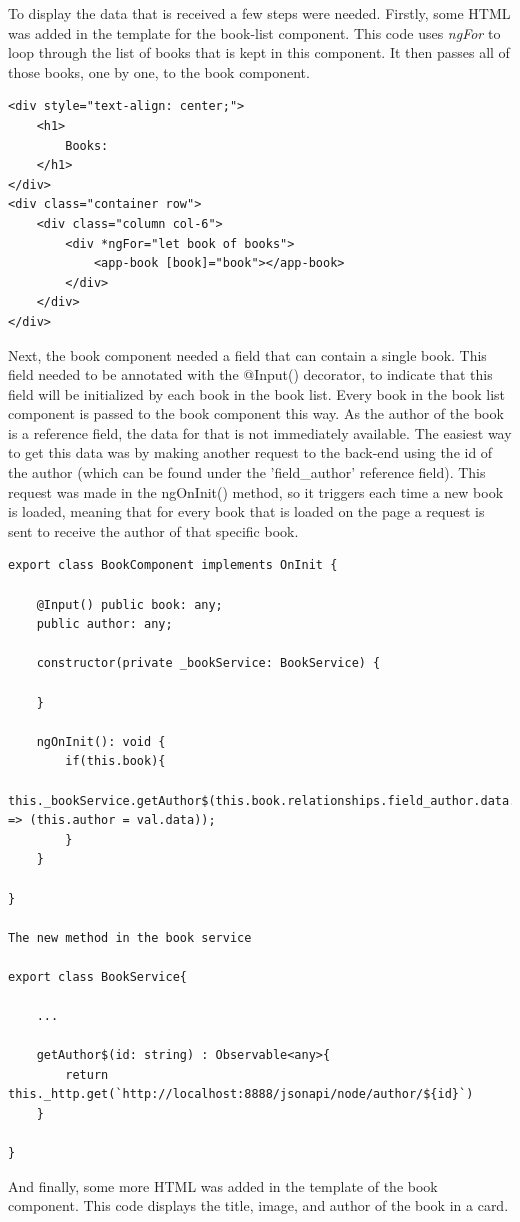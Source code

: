 To display the data that is received a few steps were needed. Firstly, some HTML was added in the template for the book-list component. This code uses \emph{ngFor} to loop through the list of books that is kept in this component. It then passes all of those books, one by one, to the book component.
\begin{lstlisting}
<div style="text-align: center;">
	<h1>
		Books:
	</h1>
</div>
<div class="container row">
	<div class="column col-6">
		<div *ngFor="let book of books">
			<app-book [book]="book"></app-book>
		</div>
	</div>
</div>
\end{lstlisting}

Next, the book component needed a field that can contain a single book. This field needed to be annotated with the @Input() decorator, to indicate that this field will be initialized by each book in the book list. Every book in the book list component is passed to the book component this way. As the author of the book is a reference field, the data for that is not immediately available. The easiest way to get this data was by making another request to the back-end using the id of the author (which can be found under the 'field\_author' reference field). This request was made in the ngOnInit() method, so it triggers each time a new book is loaded, meaning that for every book that is loaded on the page a request is sent to receive the author of that specific book.

\begin{lstlisting}
export class BookComponent implements OnInit {
	
	@Input() public book: any;
	public author: any;
	
	constructor(private _bookService: BookService) {
		
	}
	
	ngOnInit(): void {
		if(this.book){
			this._bookService.getAuthor$(this.book.relationships.field_author.data.id).subscribe(val => (this.author = val.data));
		}
	}
	
}

The new method in the book service

export class BookService{
	
	...
	
	getAuthor$(id: string) : Observable<any>{
		return this._http.get(`http://localhost:8888/jsonapi/node/author/${id}`)
	}
	
}
\end{lstlisting}

And finally, some more HTML was added in the template of the book component. This code displays the title, image, and author of the book in a card.

